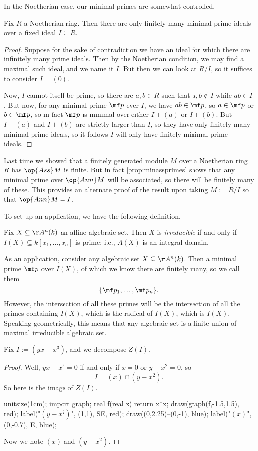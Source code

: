 In the Noetherian case, our minimal primes are somewhat controlled.
\begin{lemma}
	Fix $R$ a Noetherian ring. Then there are only finitely many minimal prime ideals over a fixed ideal $I\subseteq R$.
\end{lemma}
\begin{proof}
	Suppose for the sake of contradiction we have an ideal for which there are infinitely many prime ideals. Then by the Noetherian condition, we may find a maximal such ideal, and we name it $I$. But then we can look at $R/I$, so it suffices to consider $I=(0)$.

	Now, $I$ cannot itself be prime, so there are $a,b\in R$ such that $a,b\notin I$ while $ab\in I$. But now, for any minimal prime $\mf p$ over $I$, we have $ab\in\mf p$, so $a\in\mf p$ or $b\in\mf p$, so in fact $\mf p$ is minimal over either $I+(a)$ or $I+(b)$. But $I+(a)$ and $I+(b)$ are strictly larger than $I$, so they have only finitely many minimal prime ideals, so it follows $I$ will only have finitely minimal prime ideals.
\end{proof}
\begin{remark}
	Last time we showed that a finitely generated module $M$ over a Noetherian ring $R$ has $\op{Ass}M$ is finite. But in fact \autoref{prop:minassprimes} shows that any minimal prime over $\op{Ann}M$ will be associated, so there will be finitely many of these. This provides an alternate proof of the result upon taking $M:=R/I$ so that $\op{Ann}M=I$.
\end{remark}
To set up an application, we have the following definition.
\begin{defi}
	Fix $X\subseteq\AA^n(k)$ an affine algebraic set. Then $X$ is \textit{irreducible} if and only if $I(X)\subseteq k[x_1,\ldots,x_n]$ is prime; i.e., $A(X)$ is an integral domain.
\end{defi}
As an application, consider any algebraic set $X\subseteq\AA^n(k)$. Then a minimal prime $\mf p$ over $I(X)$, of which we know there are finitely many, so we call them
\[\{\mf p_1,\ldots,\mf p_n\}.\]
However, the intersection of all these primes will be the intersection of all the primes containing $I(X)$, which is the radical of $I(X)$, which is $I(X)$. Speaking geometrically, this means that any algebraic set is a finite union of maximal irreducible algebraic set.
\begin{prop}
	Fix $I:=\left(yx-x^3\right)$, and we decompose $Z(I)$.
\end{prop}
\begin{proof}
	Well, $yx-x^3=0$ if and only if $x=0$ or $y-x^2=0$, so
	\[I=(x)\cap\left(y-x^2\right).\]
	So here is the image of $Z(I)$.
	\begin{center}
		\begin{asy}
			unitsize(1cm);
			import graph;
			real f(real x)
			{
				return x*x;
			}
			draw(graph(f,-1.5,1.5), red);
			label("$\left(y-x^2\right)$", (1,1), SE, red);
			draw((0,2.25)--(0,-1), blue);
			label("$(x)$", (0,-0.7), E, blue);
		\end{asy}
	\end{center}
	Now we note $(x)$ and $\left(y-x^2\right)$.
\end{proof}

